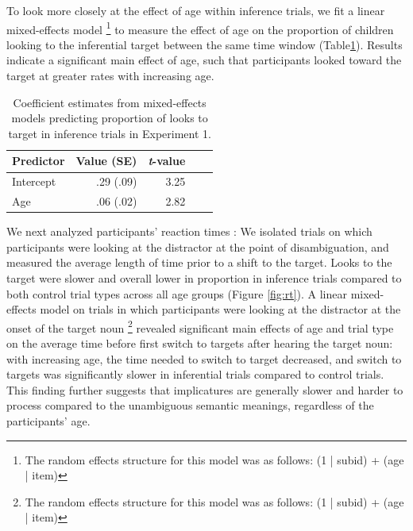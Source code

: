\documentclass[10pt,letterpaper]{article}
\begin{document}
To look more closely at the effect of age within inference trials, we fit a linear mixed-effects model \footnote{The random effects structure for this model was as follows: (1 | subid) + (age | item)} to measure the effect of age on the proportion of children looking to the inferential target between the same time window (Table\ref{tab:lmer2}). Results indicate a significant main effect of age, such that participants looked toward the target at greater rates with increasing age.

\begin{table}[b!]
\caption{\label{tab:lmer2}  Coefficient estimates from mixed-effects models predicting proportion of looks to target in inference trials in Experiment 1.} 
\begin{center} 
\begin{tabular}{l r r r l} 
\hline
Predictor  &  Value (SE) & \emph{t}-value\\
\hline
Intercept  & .29 (.09) & 3.25 \\
Age & .06 (.02) &  2.82 \\
\hline
\end{tabular} 
\end{center} 
\end{table}

We next analyzed participants' reaction times \cite{fernald2008looking}: We isolated trials on which participants were looking at the distractor at the point of disambiguation, and measured the average length of time prior to a shift to the target. Looks to the target were slower and overall lower in proportion in inference trials compared to both control trial types across all age groups (Figure \ref{fig:rt}). A linear mixed-effects model on trials in which participants were looking at the distractor at the onset of the target noun \footnote{The random effects structure for this model was as follows: (1 | subid) + (age | item)} revealed significant main effects of age and trial type on the average time before first switch to targets after hearing the target noun: with increasing age, the time needed to switch to target decreased, and switch to targets was significantly slower in inferential trials compared to control trials. This finding further suggests that implicatures are generally slower and harder to process compared to the unambiguous semantic meanings, regardless of the participants' age. 
\end{document}
